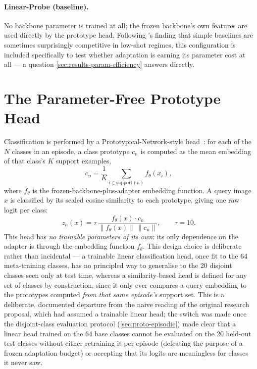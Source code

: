 \documentclass{iutbscthesis}
\begin{document}
\paragraph{Linear-Probe (baseline).} No backbone parameter is trained at all; the frozen backbone's own features are used directly by the prototype head. Following \textcite{chen2019closerlook}'s finding that simple baselines are sometimes surprisingly competitive in low-shot regimes, this configuration is included specifically to test whether adaptation is earning its parameter cost at all — a question \autoref{sec:results-param-efficiency} answers directly.

\section{The Parameter-Free Prototype Head}
\label{sec:method-head}

Classification is performed by a Prototypical-Network-style head~\cite{snell2017protonet}: for each of the $N$ classes in an episode, a class prototype $c_n$ is computed as the mean embedding of that class's $K$ support examples,
\begin{equation}
    c_n = \frac{1}{K} \sum_{i \in \text{support}(n)} f_{\theta}(x_i),
    \label{eq:prototype}
\end{equation}
where $f_\theta$ is the frozen-backbone-plus-adapter embedding function. A query image $x$ is classified by its scaled cosine similarity to each prototype, giving one raw logit per class:
\begin{equation}
    z_n(x) = \tau \, \frac{f_\theta(x) \cdot c_n}{\lVert f_\theta(x) \rVert \, \lVert c_n \rVert}, \qquad \tau = 10.
    \label{eq:proto-logit}
\end{equation}
This head has \emph{no trainable parameters of its own}: its only dependence on the adapter is through the embedding function $f_\theta$. This design choice is deliberate rather than incidental — a trainable linear classification head, once fit to the 64 meta-training classes, has no principled way to generalise to the 20 disjoint classes seen only at test time, whereas a similarity-based head is defined for any set of classes by construction, since it only ever compares a query embedding to the prototypes computed \emph{from that same episode's} support set. This is a deliberate, documented departure from the naive reading of the original research proposal, which had assumed a trainable linear head; the switch was made once the disjoint-class evaluation protocol (\autoref{sec:proto-episodic}) made clear that a linear head trained on the 64 base classes cannot be evaluated on the 20 held-out test classes without either retraining it per episode (defeating the purpose of a frozen adaptation budget) or accepting that its logits are meaningless for classes it never saw.
\end{document}
